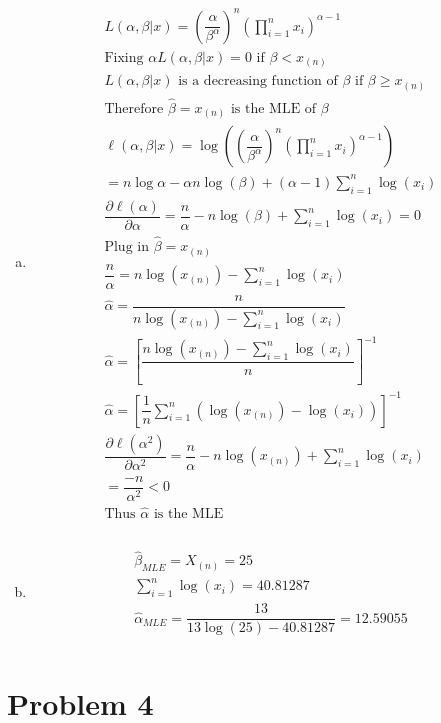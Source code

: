 \documentclass{article}
\newcommand{\B}{\beta}
\newcommand{\hb}{\hat{\beta}}
\newcommand{\sumn}{\sum_{i=1}^{n}}
\newcommand{\dll}[1]{\dfrac{\partial\ell({#1})}{\partial{#1}}}
\newcommand{\prodn}{\prod_{i=1}^{n}}
\begin{document}
\begin{flushleft}
\begin{enumerate}[(a)]
	\item 
\begin{multline*}\\
L(\alpha,\B|x)=\left(\dfrac{\alpha}{\B^\alpha}\right)^n\left(\prodn x_i\right)^{\alpha-1}\\
\text{Fixing } \alpha L(\alpha,\B|x)=0 \text{ if } \B<x_{(n)}\\
L(\alpha,\B|x) \text{ is a decreasing function of } \B \text{ if } \B\geq x_{(n)}\\
\text{Therefore } \hat{\B}=x_{(n)} \text{ is the MLE of } \B\\
\ell(\alpha,\B|x)=\log\left( \left(\dfrac{\alpha}{\B^\alpha}\right)^n\left(\prodn x_i\right)^{\alpha-1} \right)\\
=n\log\alpha-\alpha n \log(\B)+(\alpha-1)\sumn \log(x_i)\\
\dll{\alpha}=\dfrac{n}{\alpha}-n \log(\B)+\sumn \log(x_i)=0\\
\text{Plug in } \hat{\B}=x_{(n)}\\
\dfrac{n}{\alpha}=n \log(x_{(n)})-\sumn \log(x_i)\\
\hat{\alpha}=\dfrac{n}{n \log(x_{(n)})-\sumn \log(x_i)}\\
\hat{\alpha}=\left[\dfrac{n \log(x_{(n)})-\sumn \log(x_i)}{n}\right]^{-1}\\
\hat{\alpha}=\left[\dfrac{1}{n}\sumn (\log(x_{(n)})-\log(x_i))\right]^{-1}\\
\dll{\alpha^2}=\dfrac{n}{\alpha}-n \log(x_{(n)})+\sumn \log(x_i)\\
=\dfrac{-n}{\alpha^2}<0\\
\text{Thus } \hat{\alpha} \text{ is the MLE}\\
\end{multline*}

	\item 
\begin{multline*}\\
\hb_{MLE} =X_{(n)}=25\\
\sumn \log(x_i)=40.81287\\
\hat{\alpha}_{MLE}=\dfrac{13}{13\log(25)-40.81287}=12.59055\\
\end{multline*}
	
\end{enumerate}
\pagebreak
	\section*{Problem 4}
	
\begin{enumerate}[(a)]
	

\end{enumerate}
\end{flushleft}
\end{document}
